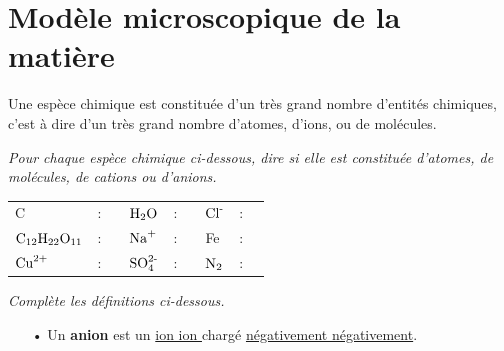 \documentclass[12pt,a4paper]{article}
\begin{document}
\section{Modèle microscopique de la matière}

\begin{definition}
Une espèce chimique est constituée d'un très grand nombre d'entités chimiques, c'est à dire d'un très grand nombre d'atomes, d'ions, ou de molécules.
\end{definition}

\emph{Pour chaque espèce chimique ci-dessous, dire si elle est constituée d'atomes, de molécules, de cations ou d'anions.}
\begin{table}[h]
\center
\begin{tabular}{l c p{} l c p{} l c p{}}
C  & : & & $\text{H}_\text{2}\text{O}$ & : & & $\text{Cl}^\text{-}$ & : & \\
$\text{C}_\text{12}\text{H}_\text{22}\text{O}_\text{11}$  & : & & $\text{Na}^\text{+}$ & : & & Fe & : & \\
$\text{Cu}^\text{2+}$  & : & & $\text{SO}_\text{4}^\text{2-}$ & : & & $\text{N}_\text{2}$ & : & \\
\end{tabular}
\end{table}

\emph{Complète les définitions ci-dessous.}

\begin{definition}
\begin{itemize}
\item[•] Un \textbf{anion} est un \underline{\color{red_c} ion ion } chargé \underline{\color{red_c} négativement négativement}.
\end{itemize}
\end{definition}
\end{document}
